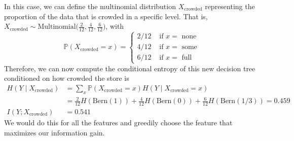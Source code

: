 \begin{example}
    In this case, we can define the multinomial distribution $X_{\mathrm{crowded}}$ representing the proportion of the data that is crowded in a specific level. That is, $X_{\mathrm{crowded}} \sim \mathrm{Multinomial}(\frac{2}{12}, \frac{4}{12}, \frac{6}{12} \big)$, with 
    \begin{equation}
      \mathbb{P}(X_{\mathrm{crowded}} = x) = \begin{cases} 2/12 & \text{ if } x = \text{ none} \\ 4/12 & \text{ if } x = \text{ some} \\ 6/12 & \text{ if } x = \text{ full} \end{cases}
    \end{equation}
    Therefore, we can now compute the conditional entropy of this new decision tree conditioned on how crowded the store is 
    \begin{align}
      H(Y \mid X_{\mathrm{crowded}}) & = \sum_x \mathbb{P}(X_{\mathrm{crowded}} = x) H(Y \mid X_{\mathrm{crowded}} = x) \\
      & = \frac{2}{12} H(\mathrm{Bern}(1)) + \frac{4}{12} H(\mathrm{Bern}(0)) + \frac{6}{12} H(\mathrm{Bern}(1/3)) = 0.459 \\
      I(Y; X_{\mathrm{crowded}}) & = 0.541
    \end{align}
    We would do this for all the features and greedily choose the feature that maximizes our information gain. 
  \end{example}

